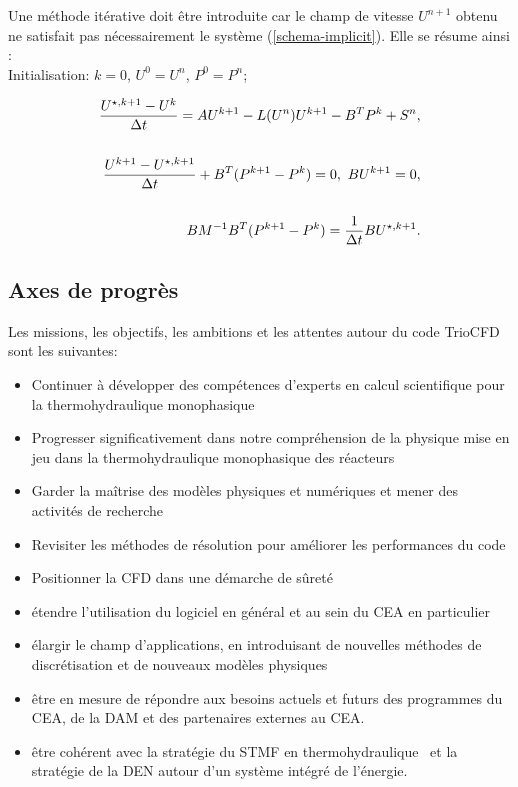 Une m\'ethode it\'erative doit \^etre introduite car le champ de vitesse $ U ^{n+1}$ obtenu ne satisfait pas n\'ecessairement le syst\`eme (\ref{schema-implicit}). Elle se r\'esume ainsi :\\


Initialisation: $k=0$, $U^0=U^n$, $P^0=P^n$;

\begin{eqnarray*}
\ds{
\frac{U^{\star, k+1}-U^{k}}{\Delta t}=AU^{k+1}-L(U^n)U^{k+1}-B^T P^{k} +S^n ,
}\\
\\
\ds{\frac{U^{k+1}-U^{\star, k+1}}{\Delta t}+B^T (P^{k+1}-P^k)=0,\ BU^{k+1}=0 ,
}\\
\\
\ds{BM^{-1}B^T(P^{k+1}-P^k)=\frac{1}{\Delta t}B U^{\star, k+1}.
}
\end{eqnarray*}



\subsection{Axes de progr\`es}
\label{section-strat\'egie}

Les missions, les objectifs, les ambitions et les attentes autour du code TrioCFD sont les suivantes: 

\begin{itemize}

\item Continuer \`a d\'evelopper des comp\'etences d'experts en calcul scientifique pour la thermohydraulique monophasique 

\item Progresser significativement dans notre compr\'ehension de la physique mise en jeu dans la thermohydraulique monophasique des r\'eacteurs

\item Garder la ma\^itrise des mod\`eles physiques et num\'eriques et mener des activit\'es de recherche

\item Revisiter les m\'ethodes de r\'esolution pour am\'eliorer les performances du code

\item Positionner la CFD dans une d\'emarche de sûret\'e 

\item \'etendre l'utilisation du logiciel en g\'en\'eral et au sein du CEA en particulier

\item \'elargir le champ d'applications, en introduisant de nouvelles m\'ethodes de discr\'etisation et de nouveaux mod\`eles physiques

\item \^etre en mesure de r\'epondre aux besoins actuels et futurs des programmes du CEA, de la DAM et des partenaires externes au CEA.

\item \^etre coh\'erent avec la strat\'egie du STMF en thermohydraulique~\cite{Metaphor} et la strat\'egie de la DEN autour d'un syst\`eme int\'egr\'e de l'\'energie. 

\end{itemize}

